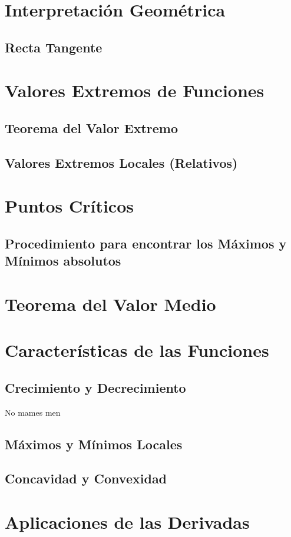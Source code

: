 \documentclass[12pt,a4paper]{book}
\begin{document}
{\section{Interpretación Geométrica}
\subsection{Recta Tangente}
\section{Valores Extremos de Funciones}
\subsection{Teorema del Valor Extremo}
\subsection{Valores Extremos Locales (Relativos)}
\section{Puntos Críticos}
\subsection{Procedimiento para encontrar los Máximos y Mínimos absolutos}
\section{Teorema del Valor Medio}
\section{Características de las Funciones}
\subsection{Crecimiento y Decrecimiento}
No mames men
\subsection{Máximos y Mínimos Locales}
\subsection{Concavidad y Convexidad}
\section{Aplicaciones de las Derivadas}
}
\end{document}
